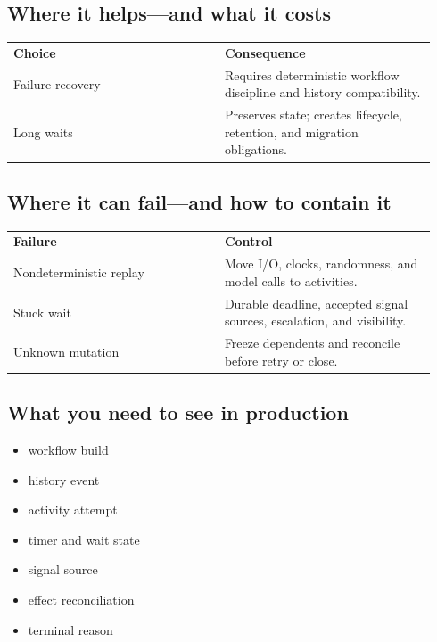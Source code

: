 \subsection{Where it helps—and what it costs}

\BookTableStart
\small
\begin{tabular}{@{}Y{0.4700\linewidth}Y{0.4700\linewidth}@{}}
\color{white}\bfseries \textbf{Choice} & \color{white}\bfseries \textbf{Consequence} \\
Failure recovery & Requires deterministic workflow discipline and history compatibility. \\
Long waits & Preserves state; creates lifecycle, retention, and migration obligations. \\
\end{tabular}
\BookTableEnd

\subsection{Where it can fail—and how to contain it}

\BookTableStart
\small
\begin{tabular}{@{}Y{0.4700\linewidth}Y{0.4700\linewidth}@{}}
\color{white}\bfseries \textbf{Failure} & \color{white}\bfseries \textbf{Control} \\
Nondeterministic replay & Move I/O, clocks, randomness, and model calls to activities. \\
Stuck wait & Durable deadline, accepted signal sources, escalation, and visibility. \\
Unknown mutation & Freeze dependents and reconcile before retry or close. \\
\end{tabular}
\BookTableEnd

\subsection{What you need to see in production}

\begin{itemize}

\item workflow build

\item history event

\item activity attempt

\item timer and wait state

\item signal source

\item effect reconciliation

\item terminal reason

\end{itemize}

